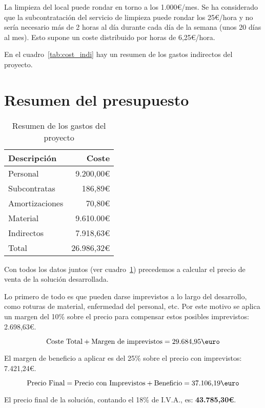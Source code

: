 La limpieza del local puede rondar en torno a los 1.000\euro/mes. Se ha considerado que la subcontratación del servicio de limpieza puede rondar los 25\euro/hora y no sería necesario más de 2 horas al día durante cada día de la semana (unos 20 días al mes). Esto supone un coste distribuido por horas de 6,25\euro/hora.

En el cuadro~\ref{tab:cost_indi} hay un resumen de los gastos indirectos del proyecto.

\section{Resumen del presupuesto}

\begin{table}
	\centering
	
	\begin{tabular}{|l|r|}
		\hline
		Descripción  & Coste  \\
		\hline
		Personal     & 9.200,00\euro \\
		\hline
		Subcontratas & 186,89\euro \\
		\hline
		Amortizaciones & 70,80\euro\\
		\hline
		Material     & 9.610.00\euro\\
		\hline
		Indirectos   & 7.918,63\euro\\
		\hline
		\hline
		Total        & 26.986,32\euro\\
		\hline
	\end{tabular}
	\caption{Resumen de los gastos del proyecto}\label{tab:resu_gastos}
\end{table}

Con todos los datos juntos (ver cuadro~\ref{tab:resu_gastos}) precedemos a calcular el precio de venta de la solución desarrollada.

Lo primero de todo es que pueden darse imprevistos a lo largo del desarrollo, como roturas de material, enfermedad del personal, etc. Por este motivo se aplica un margen del 10\% sobre el precio para compensar estos posibles imprevistos: 2.698,63\euro.

$$
\mbox{Coste Total} + \mbox{Margen de imprevistos} = \mbox{29.684,95\euro}
$$

El margen de beneficio a aplicar es del 25\% sobre el precio con imprevistos: 7.421,24\euro.

$$
	\mbox{Precio Final} = \mbox{Precio con Imprevistos} + \mbox{Beneficio} = \mbox{37.106,19\euro}
$$

El precio final de la solución, contando el 18\% de I.V.A., es: {\large \textbf{43.785,30\euro}}.